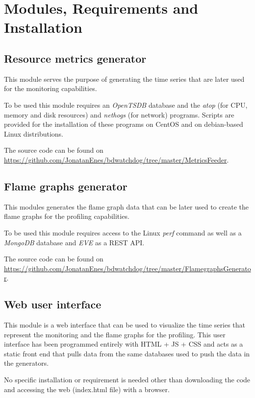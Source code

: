 \documentclass[12pt]{article}
\begin{document}
\section{Modules, Requirements and Installation}

\subsection{Resource metrics generator}

This module serves the purpose of generating the time series that are later used for the monitoring capabilities. 

To be used this module requires an \textit{OpenTSDB} database and the \textit{atop} (for CPU, memory and disk resources) and \textit{nethogs} (for network) programs. Scripts are provided for the installation of these programs on CentOS and on debian-based Linux distributions.

The source code can be found on \url{https://github.com/JonatanEnes/bdwatchdog/tree/master/MetricsFeeder}.

\subsection{Flame graphs generator}

This modules generates the flame graph data that can be later used to create the flame graphs for the profiling capabilities.

To be used this module requires access to the Linux \textit{perf} command as well as a \textit{MongoDB} database and \textit{EVE} as a REST API. 

The source code can be found on \url{https://github.com/JonatanEnes/bdwatchdog/tree/master/FlamegraphsGenerator}.

\subsection{Web user interface}

This module is a web interface that can be used to visualize the time series that represent the monitoring and the flame graphs for the profiling. This user interface has been programmed entirely with HTML + JS + CSS and acts as a static front end that pulls data from the same databases used to push the data in the generators. 

No specific installation or requirement is needed other than downloading the code and accessing the web (index.html file) with a browser.
\end{document}
